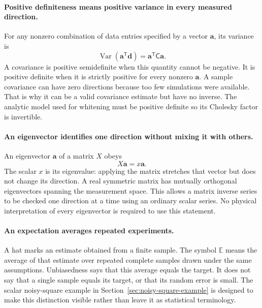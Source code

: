 \documentclass[11pt]{article}
\newcommand{\Cov}{\mathsf{C}}
\newcommand{\T}{^{\mathsf{T}}}
\newcommand{\E}{\mathbb{E}}
\newcommand{\Var}{\operatorname{Var}}
\begin{document}
\paragraph{Positive definiteness means positive variance in every measured direction.}
For any nonzero combination of data entries specified by a vector
$\boldsymbol a$, its variance is
\begin{equation}
 \Var(\boldsymbol a\T\boldsymbol d)=\boldsymbol a\T\Cov\boldsymbol a.
\end{equation}
A covariance is positive semidefinite when this quantity cannot be negative.
It is positive definite when it is strictly positive for every nonzero
$\boldsymbol a$. A sample covariance can have zero directions because too
few simulations were available. That is why it can be a valid covariance
estimate but have no inverse. The analytic model used for whitening must
be positive definite so its Cholesky factor is invertible.

\paragraph{An eigenvector identifies one direction without mixing it with others.}
An eigenvector $\boldsymbol a$ of a matrix $X$ obeys
\begin{equation}
 X\boldsymbol a=x\boldsymbol a.
\end{equation}
The scalar $x$ is its eigenvalue: applying the matrix stretches that vector
but does not change its direction. A real symmetric matrix has mutually
orthogonal eigenvectors spanning the measurement space. This allows a
matrix inverse series to be checked one direction at a time using an
ordinary scalar series. No physical interpretation of every eigenvector
is required to use this statement.

\paragraph{An expectation averages repeated experiments.}
A hat marks an estimate obtained from a finite sample. The symbol $\E$
means the average of that estimate over repeated complete samples drawn
under the same assumptions. Unbiasedness says that this average equals
the target. It does not say that a single sample equals its target, or
that its random error is small. The scalar noisy-square example in
Section~\ref{sec:noisy-square-example} is designed to make this distinction
visible rather than leave it as statistical terminology.
\end{document}
